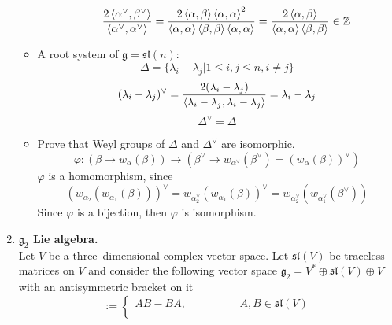 \documentclass[12pt]{article}
\theoremstyle{definition}
\begin{document}
\begin{enumerate}
\begin{itemize}
\begin{itemize}
\begin{equation}
                \frac{2\braket{\alpha^\vee,\beta^\vee}}{\braket{\alpha^\vee,\alpha^\vee}}=\frac{2\braket{\alpha,\beta}\braket{\alpha,\alpha}^2}{\braket{\alpha,\alpha}\braket{\beta,\beta}\braket{\alpha,\alpha}}=\frac{2\braket{\alpha,\beta}}{\braket{\alpha,\alpha}\braket{\beta,\beta}}\in\mathbb{Z}
            \end{equation}
        \end{itemize}
        \item A root system of $\mathfrak{g}=\mathfrak{sl}(n)$:
        \begin{equation}
            \Delta=\{\lambda_i-\lambda_j|1\leq i,j\leq n, i\neq j\}
        \end{equation}
        \begin{equation}
            (\lambda_i-\lambda_j)^\vee=\frac{2(\lambda_i-\lambda_j)}{\braket{\lambda_i-\lambda_j,\lambda_i-\lambda_j}}=\lambda_i-\lambda_j
        \end{equation}
        \begin{equation}
            \boxed{\Delta^\vee=\Delta}
        \end{equation}
        \item Prove that Weyl groups of $\Delta$ and $\Delta^\vee$ are isomorphic.
        \begin{equation}
            \varphi:(\beta\rightarrow w_\alpha(\beta))\rightarrow(\beta^\vee\rightarrow w_{\alpha^\vee}(\beta^\vee)=(w_\alpha(\beta))^\vee)
        \end{equation}
        $\varphi$ is a homomorphism, since
        \begin{equation}
            (w_{\alpha_2}(w_{\alpha_1}(\beta)))^\vee=w_{\alpha^\vee_2}(w_{\alpha_1}(\beta))^\vee=w_{\alpha^\vee_2}(w_{\alpha^\vee_1}(\beta^\vee))
        \end{equation}
        Since $\varphi$ is a bijection, then $\varphi$ is isomorphism.
    \end{itemize}
    \item \textbf{$\mathfrak{g}_2$ Lie algebra.}\\
    Let $V$ be a three–dimensional complex vector space. Let $\mathfrak{sl}(V)$ be traceless matrices on $V$ and consider the following vector space $\mathfrak{g}_2=V^*\oplus\mathfrak{sl}(V)\oplus V$ with an antisymmetric bracket on it
    \begin{equation}
        [A,B]:=\begin{cases}
            AB-BA,\quad\quad\quad\quad\;\;\; A,B\in\mathfrak{sl}(V)\\

\end{cases}
\end{equation}
\end{enumerate}
\end{document}
